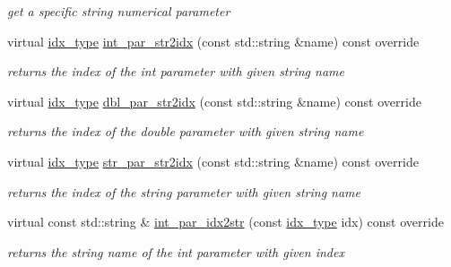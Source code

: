 \begin{Indent}
\begin{DoxyCompactItemize}
\begin{DoxyCompactList}\small\item\em get a specific string numerical parameter \end{DoxyCompactList}\item 
virtual \mbox{\hyperlink{class_s_m_spp__di__unipi__it_1_1_thin_compute_interface_aa3d710629ad8c434286726ad810c3b47}{idx\+\_\+type}} \mbox{\hyperlink{class_s_m_spp__di__unipi__it_1_1_f_row_constraint_ae281b6699b0707a5cdc1e82b76d26c09}{int\+\_\+par\+\_\+str2idx}} (const std\+::string \&name) const override
\begin{DoxyCompactList}\small\item\em returns the index of the int parameter with given string name \end{DoxyCompactList}\item 
virtual \mbox{\hyperlink{class_s_m_spp__di__unipi__it_1_1_thin_compute_interface_aa3d710629ad8c434286726ad810c3b47}{idx\+\_\+type}} \mbox{\hyperlink{class_s_m_spp__di__unipi__it_1_1_f_row_constraint_a6d353ac3d1200d9bea89235da61bc4f3}{dbl\+\_\+par\+\_\+str2idx}} (const std\+::string \&name) const override
\begin{DoxyCompactList}\small\item\em returns the index of the double parameter with given string name \end{DoxyCompactList}\item 
virtual \mbox{\hyperlink{class_s_m_spp__di__unipi__it_1_1_thin_compute_interface_aa3d710629ad8c434286726ad810c3b47}{idx\+\_\+type}} \mbox{\hyperlink{class_s_m_spp__di__unipi__it_1_1_f_row_constraint_a0ddaa949b3db7b6adeb4ed8d623637ca}{str\+\_\+par\+\_\+str2idx}} (const std\+::string \&name) const override
\begin{DoxyCompactList}\small\item\em returns the index of the string parameter with given string name \end{DoxyCompactList}\item 
virtual const std\+::string \& \mbox{\hyperlink{class_s_m_spp__di__unipi__it_1_1_f_row_constraint_a61e973f39747f63b8f56d97cc62e32ce}{int\+\_\+par\+\_\+idx2str}} (const \mbox{\hyperlink{class_s_m_spp__di__unipi__it_1_1_thin_compute_interface_aa3d710629ad8c434286726ad810c3b47}{idx\+\_\+type}} idx) const override
\begin{DoxyCompactList}\small\item\em returns the string name of the int parameter with given index \end{DoxyCompactList}\item 

\end{DoxyCompactItemize}
\end{Indent}
